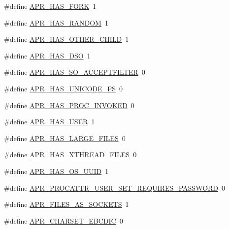 \begin{DoxyCompactItemize}
\item 
\#define \hyperlink{group__apr__platform_ga3261ef06837fa5dc1a0164f7b0f16fab}{A\+P\+R\+\_\+\+H\+A\+S\+\_\+\+F\+O\+RK}~1
\item 
\#define \hyperlink{group__apr__platform_ga1a277e1905ab841d2979eff95816f8fb}{A\+P\+R\+\_\+\+H\+A\+S\+\_\+\+R\+A\+N\+D\+OM}~1
\item 
\#define \hyperlink{group__apr__platform_ga082384ec95907197e41f546570e06a69}{A\+P\+R\+\_\+\+H\+A\+S\+\_\+\+O\+T\+H\+E\+R\+\_\+\+C\+H\+I\+LD}~1
\item 
\#define \hyperlink{group__apr__platform_gae41e3d3c78f6937ea2de78b03629494a}{A\+P\+R\+\_\+\+H\+A\+S\+\_\+\+D\+SO}~1
\item 
\#define \hyperlink{group__apr__platform_gaa6797fde63363c83c54c97a2a873e84d}{A\+P\+R\+\_\+\+H\+A\+S\+\_\+\+S\+O\+\_\+\+A\+C\+C\+E\+P\+T\+F\+I\+L\+T\+ER}~0
\item 
\#define \hyperlink{group__apr__platform_gae1e6a359fe305ed4ede275f404e61cfe}{A\+P\+R\+\_\+\+H\+A\+S\+\_\+\+U\+N\+I\+C\+O\+D\+E\+\_\+\+FS}~0
\item 
\#define \hyperlink{group__apr__platform_gacd61f2c191c71203833599e8caee3e79}{A\+P\+R\+\_\+\+H\+A\+S\+\_\+\+P\+R\+O\+C\+\_\+\+I\+N\+V\+O\+K\+ED}~0
\item 
\#define \hyperlink{group__apr__platform_ga9d8d5646ade1d3d29e456d8df29a656a}{A\+P\+R\+\_\+\+H\+A\+S\+\_\+\+U\+S\+ER}~1
\item 
\#define \hyperlink{group__apr__platform_gab5019720a44a0a412b053bd4c8275ac0}{A\+P\+R\+\_\+\+H\+A\+S\+\_\+\+L\+A\+R\+G\+E\+\_\+\+F\+I\+L\+ES}~0
\item 
\#define \hyperlink{group__apr__platform_ga98aef4781225d1713d088283f4abd8f2}{A\+P\+R\+\_\+\+H\+A\+S\+\_\+\+X\+T\+H\+R\+E\+A\+D\+\_\+\+F\+I\+L\+ES}~0
\item 
\#define \hyperlink{group__apr__platform_gae5e245b691c1f1765e547480de321731}{A\+P\+R\+\_\+\+H\+A\+S\+\_\+\+O\+S\+\_\+\+U\+U\+ID}~1
\item 
\#define \hyperlink{group__apr__platform_ga0108ca8b595e62174e8b42cce0d063f5}{A\+P\+R\+\_\+\+P\+R\+O\+C\+A\+T\+T\+R\+\_\+\+U\+S\+E\+R\+\_\+\+S\+E\+T\+\_\+\+R\+E\+Q\+U\+I\+R\+E\+S\+\_\+\+P\+A\+S\+S\+W\+O\+RD}~0
\item 
\#define \hyperlink{group__apr__platform_gace899f1ccb69c00ae7c65212ca5890b1}{A\+P\+R\+\_\+\+F\+I\+L\+E\+S\+\_\+\+A\+S\+\_\+\+S\+O\+C\+K\+E\+TS}~1
\item 
\#define \hyperlink{group__apr__platform_ga8c71221bae49df0b88a0f725e96c681f}{A\+P\+R\+\_\+\+C\+H\+A\+R\+S\+E\+T\+\_\+\+E\+B\+C\+D\+IC}~0

\end{DoxyCompactItemize}
